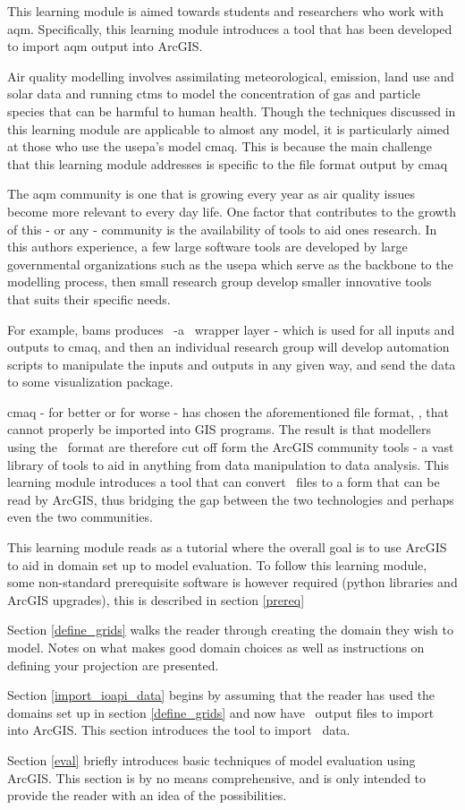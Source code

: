 This learning module is aimed towards students and researchers who
work with \acf{aqm}.  Specifically, this learning module introduces a
tool that has been developed to import \ac{aqm} output into ArcGIS.

Air quality modelling involves assimilating meteorological, emission,
land use and solar data and running \acfp{ctm} to model the
concentration of gas and particle species that can be harmful to human
health.  Though the techniques discussed in this learning module are
applicable to almost any model, it is particularly aimed at those who
use the \acs{usepa}'s model \ac{cmaq}.  This is because the main
challenge that this learning module addresses is specific to the file
format output by \ac{cmaq}

The \ac{aqm} community is one that is growing every year as air
quality issues become more relevant to every day life.  One factor
that contributes to the growth of this - or any - community is the
availability of tools to aid ones research.  In this authors
experience, a few large software tools are developed by large
governmental organizations such as the \acs{usepa} which serve as the
backbone to the modelling process, then small research group develop
smaller innovative tools that suits their specific needs.

For example, \acs{bams} produces \ioapi~-a \netcdf~wrapper layer -
which is used for all inputs and outputs to \ac{cmaq}, and then an
individual research group will develop automation scripts to
manipulate the inputs and outputs in any given way, and send the data
to some visualization package.

\ac{cmaq} - for better or for worse - has chosen the aforementioned file format,
\ioapi, that cannot properly be imported into GIS programs.  The
result is that modellers using the \ioapi~format are therefore cut off
form the ArcGIS community tools - a vast library of tools to aid in
anything from data manipulation to data analysis.  This learning
module introduces a tool that can convert \ioapi~files to a form that
can be read by ArcGIS, thus bridging the gap between the two
technologies and perhaps even the two communities.

This learning module reads as a tutorial where the overall goal is to
use ArcGIS to aid in domain set up to model evaluation.  To follow
this learning module, some non-standard prerequisite software is
however required (python libraries and ArcGIS upgrades), this is
described in section \ref{prereq}

Section \ref{define_grids} walks the reader through creating the
domain they wish to model.  Notes on what makes good domain choices as
well as instructions on defining your projection are presented.

Section \ref{import_ioapi_data} begins by assuming that the reader has
used the domains set up in section \ref{define_grids} and now have
\ioapi~output files to import into ArcGIS.  This section introduces
the tool to import \ioapi~data.

Section \ref{eval} briefly introduces basic techniques of model
evaluation using ArcGIS.  This section is by no means comprehensive,
and is only intended to provide the reader with an idea of the
possibilities.

